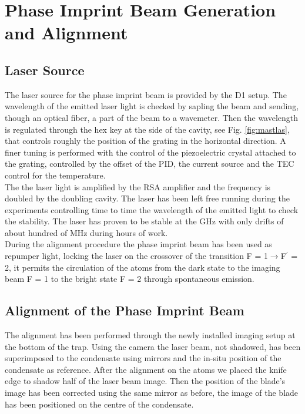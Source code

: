 \documentclass[../thesis.tex]{subfiles}
\begin{document}
\chapter{Phase Imprint Beam Generation and Alignment}

\section{Laser Source}

The laser source for the phase imprint beam is provided by the D1 setup. The wavelength of the emitted laser light is checked by sapling the beam and sending, though an optical fiber, a part of the beam to a wavemeter. Then the wavelength is regulated through the hex key at the side of the cavity, see Fig. \ref{fig:mastlas}, that controls roughly the position of the grating in the horizontal direction. A finer tuning is performed with the control of the piezoelectric crystal attached to the grating, controlled by the offset of the PID, the current source and the TEC control for the temperature.\\
The the laser light is amplified by the RSA amplifier and the frequency is doubled by the doubling cavity. The laser has been left free running during the experiments controlling time to time the wavelength of the emitted light to check the stability.
The laser has proven to be stable at the GHz with only drifts of about hundred of MHz during hours of work.\\

During the alignment procedure the phase imprint beam has been used as repumper light, locking the laser on the crossover of the transition F = 1$\rightarrow$F$^\prime$ = 2, it permits the circulation of the atoms from the dark state to the imaging beam F = 1 to the bright state F = 2 through spontaneous emission.

\section{Alignment of the Phase Imprint Beam}

The alignment has been performed through the newly installed imaging setup at the bottom of the trap.
Using the camera the laser beam, not shadowed, has been superimposed to the condensate using mirrors and the in-situ position of the condensate as reference. After the alignment on the atoms we placed the knife edge to shadow half of the laser beam image. Then the position of the blade's image has been corrected using the same mirror as before, the image of the blade has been positioned on the centre of the condensate.\\
\end{document}
